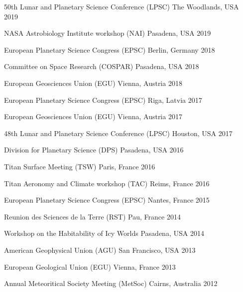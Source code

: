 
\begin{cvhonors}

    \cvhonor
    {50th Lunar and Planetary Science Conference (LPSC)}
    {}
    {The Woodlands, USA}
    {2019}

    \cvhonor
    {NASA Astrobiology Institute workshop (NAI)}
    {}
    {Pasadena, USA}
    {2019}

    \cvhonor
    {European Planetary Science Congress (EPSC)}
    {}
    {Berlin, Germany}
    {2018}

    \cvhonor
    {Committee on Space Research (COSPAR)}
    {}
    {Pasadena, USA}
    {2018}

    \cvhonor
    {European Geosciences Union (EGU)}
    {}
    {Vienna, Austria}
    {2018}

    \cvhonor
    {European Planetary Science Congress (EPSC)}
    {}
    {Riga, Latvia}
    {2017}

  \cvhonor
    {European Geosciences Union (EGU)}
    {}
    {Vienna, Austria}
    {2017}

  \cvhonor
    {48th Lunar and Planetary Science Conference (LPSC)}
    {}
    {Houston, USA}
    {2017}

  \cvhonor
    {Division for Planetary Science (DPS)}
    {}
    {Pasadena, USA}
    {2016}

  \cvhonor
    {Titan Surface Meeting (TSW)}
    {}
    {Paris, France}
    {2016}

  \cvhonor
    {Titan Aeronomy and Climate workshop (TAC)}
    {}
    {Reims, France}
    {2016}

  \cvhonor
    {European Planetary Science Congress (EPSC)}
    {}
    {Nantes, France}
    {2015}

\end{cvhonors}
\begin{cvhonors}

  \cvhonor
    {Reunion des Sciences de la Terre (RST)}
    {}
    {Pau, France}
    {2014}

  \cvhonor
    {Workshop on the Habitability of Icy Worlds}
    {}
    {Pasadena, USA}
    {2014}

  \cvhonor
    {American Geophysical Union (AGU)}
    {}
    {San Francisco, USA}
    {2013}

  \cvhonor
    {European Geological Union (EGU)}
    {}
    {Vienna, France}
    {2013}

  \cvhonor
    {Annual Meteoritical Society Meeting (MetSoc)}
    {}
    {Cairns, Australia}
    {2012}


\end{cvhonors}
